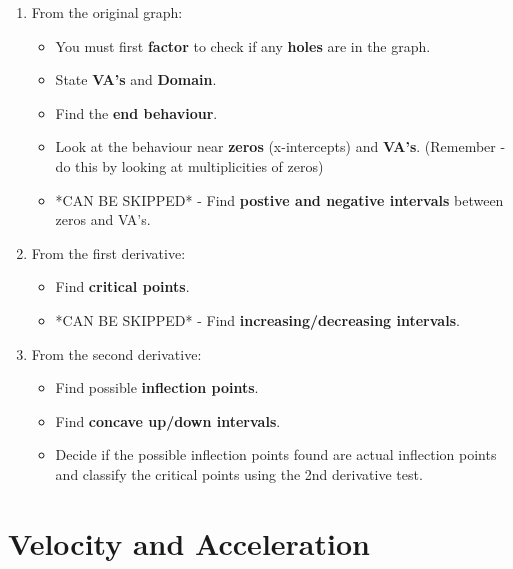\documentclass[12pt,fleqn]{book} %
\begin{document}
\begin{enumerate}
    \item From the original graph:
          \begin{itemize}
              \item You must first \textbf{factor} to check if any \textbf{holes} are in the graph.
              \item State \textbf{VA's} and \textbf{Domain}.
              \item Find the \textbf{end behaviour}.
              \item Look at the behaviour near \textbf{zeros} (x-intercepts) and \textbf{VA's}. (Remember - do this by looking at multiplicities of zeros)
              \item *CAN BE SKIPPED* - Find \textbf{postive and negative intervals} between zeros and VA's.
          \end{itemize}

          \vspace*{4mm}

    \item From the first derivative:
          \begin{itemize}
              \item Find \textbf{critical points}.
              \item *CAN BE SKIPPED* - Find \textbf{increasing/decreasing intervals}.
          \end{itemize}

          \vspace*{4mm}

    \item From the second derivative:
          \begin{itemize}
              \item Find possible \textbf{inflection points}.
              \item Find \textbf{concave up/down intervals}.
              \item Decide if the possible inflection points found are actual inflection points and classify the critical points using the 2nd derivative test.
          \end{itemize}
\end{enumerate}



\section{Velocity and Acceleration}
\end{document}
